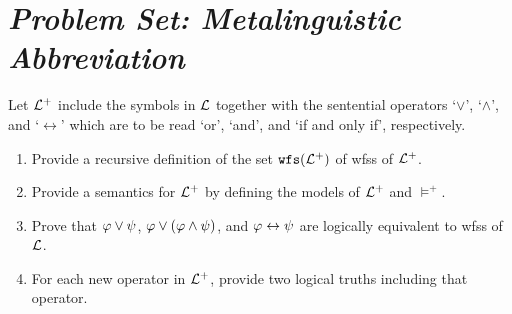 \documentclass[a4paper, 11pt]{article} %
\begin{document}
\section*{\it Problem Set: Metalinguistic Abbreviation}

Let $\mathcal{L}^+$ include the symbols in $\mathcal{L}$ together with the sentential operators `$\vee$', `$\wedge$', and `$\leftrightarrow$' which are to be read `or', `and', and `if and only if', respectively.
\begin{enumerate}[itemsep=2pt]\small
	\item Provide a recursive definition of the set $\texttt{wfs}(\mathcal{L}^+)$ of wfss of $\mathcal{L}^+$.
	\item Provide a semantics for $\mathcal{L}^+$ by defining the models of $\mathcal{L}^+$ and $\vDash^+$.
	\item Prove that $\varphi \vee \psi$, $\varphi \vee (\varphi \wedge \psi)$, and $\varphi\leftrightarrow \psi$ are logically equivalent to wfss of $\mathcal{L}$.
	\item For each new operator in $\mathcal{L}^+$, provide two logical truths including that operator.
\end{enumerate}

\end{document}
